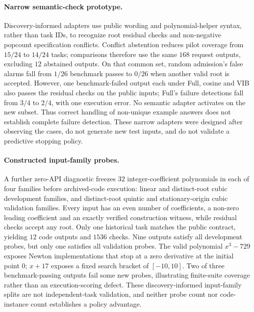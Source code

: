 \documentclass[11pt,twoside,twocolumn,letterpaper]{article}
\begin{document}
\paragraph{Narrow semantic-check prototype.} Discovery-informed adapters use public wording and polynomial-helper syntax, rather than task IDs, to recognize root residual checks and non-negative popcount specification conflicts. Conflict abstention reduces pilot coverage from $15/24$ to $14/24$ tasks; comparisons therefore use the same $168$ request outputs, excluding $12$ abstained outputs. On that common set, random admission's false alarms fall from $1/26$ benchmark passes to $0/26$ when another valid root is accepted. However, one benchmark-failed output each under Full, cosine and VIB also passes the residual checks on the public inputs; Full's failure detections fall from $3/4$ to $2/4$, with one execution error. No semantic adapter activates on the new subset. Thus correct handling of non-unique example answers does not establish complete failure detection. These narrow adapters were designed after observing the cases, do not generate new test inputs, and do not validate a predictive stopping policy.

\paragraph{Constructed input-family probes.} A further zero-API diagnostic freezes $32$ integer-coefficient polynomials in each of four families before archived-code execution: linear and distinct-root cubic development families, and distinct-root quintic and stationary-origin cubic validation families. Every input has an even number of coefficients, a non-zero leading coefficient and an exactly verified construction witness, while residual checks accept any root. Only one historical task matches the public contract, yielding $12$ code outputs and $1536$ checks. Nine outputs satisfy all development probes, but only one satisfies all validation probes. The valid polynomial $x^3-729$ exposes Newton implementations that stop at a zero derivative at the initial point $0$; $x+17$ exposes a fixed search bracket of $[-10,10]$. Two of three benchmark-passing outputs fail some new probes, illustrating finite-suite coverage rather than an execution-scoring defect. These discovery-informed input-family splits are not independent-task validation, and neither probe count nor code-instance count establishes a policy advantage.
\end{document}
